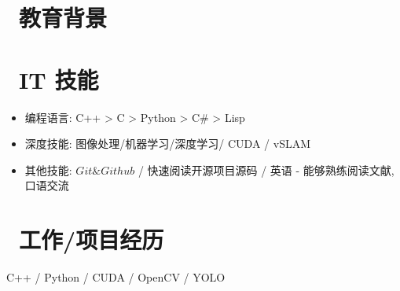 \documentclass{resume}
\begin{document}


\section{\faGraduationCap\  教育背景}

\section{\faCogs\ IT 技能}
\begin{itemize}[parsep=0.5ex]
  \item 编程语言: C++ > C > Python > C\# > Lisp
  \item 深度技能: 图像处理/机器学习/深度学习/ CUDA / vSLAM
  \item 其他技能: $Git\& Github$ / 快速阅读开源项目源码 / 英语 - 能够熟练阅读文献,口语交流
\end{itemize}

\section{\faUsers\ 工作/项目经历}

C++ / Python / CUDA / OpenCV / YOLO
\end{document}
